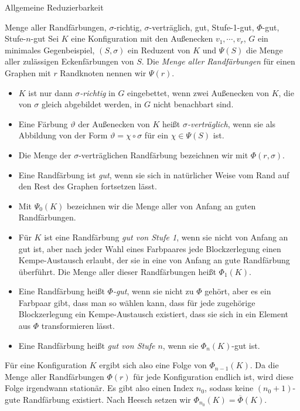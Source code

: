 \begin{section}{Allgemeine Reduzierbarkeit}
 \begin{definition}{Menge aller Randfärbungen, $\sigma$-richtig, $\sigma$-verträglich, gut, Stufe-1-gut, $\Phi$-gut, Stufe-$n$-gut}
  Sei $K$ eine Konfiguration mit den Außenecken $v_1,\cdots,v_r$, $G$ ein minimales Gegenbeispiel, $(S,\sigma)$ ein Reduzent von $K$ und $\Psi(S)$ die Menge aller zulässigen Eckenfärbungen von $S$. Die \textit{Menge aller Randfärbungen} für einen Graphen mit $r$ Randknoten nennen wir $\Psi(r)$.
  \begin{itemize}
   \item $K$ ist nur dann \textit{$\sigma$-richtig} in $G$ eingebettet, wenn zwei Außenecken von $K$, die von $\sigma$ gleich abgebildet werden, in $G$ nicht benachbart sind. 
   \item Eine Färbung $\vartheta$ der Außenecken von $K$ heißt \textit{$\sigma$-verträglich}, wenn sie als Abbildung von der Form $\vartheta = \chi \circ \sigma$ für ein $\chi \in \Psi(S)$ ist.
   \item Die Menge der $\sigma$-verträglichen Randfärbung bezeichnen wir mit $\Phi(r,\sigma)$.
   \item Eine Randfärbung ist \textit{gut}, wenn sie sich in natürlicher Weise vom Rand auf den Rest des Graphen fortsetzen lässt.
   \item Mit $\Psi_0(K)$ bezeichnen wir die Menge aller von Anfang an guten Randfärbungen.
   \item Für $K$ ist eine Randfärbung \textit{gut von Stufe 1}, wenn sie nicht von Anfang an gut ist, aber nach jeder Wahl eines Farbpaares jede Blockzerlegung einen Kempe-Austausch erlaubt, der sie in eine von Anfang an gute Randfärbung überführt. Die Menge aller dieser Randfärbungen heißt $\Phi_1(K)$.
   \item Eine Randfärbung heißt \textit{$\Phi$-gut}, wenn sie nicht zu $\Phi$ gehört, aber es ein Farbpaar gibt, dass man so wählen kann, dass für jede zugehörige Blockzerlegung ein Kempe-Austausch existiert, dass sie sich in ein Element aus $\Phi$ transformieren lässt.
   \item Eine Randfärbung heißt \textit{gut von Stufe $n$}, wenn sie $\Phi_n(K)$-gut ist.
  \end{itemize}
  Für eine Konfiguration $K$ ergibt sich also eine Folge von $\Phi_{n-1}(K)$. Da die Menge aller Randfärbungen $\Phi(r)$ für jede Konfiguration endlich ist, wird diese Folge irgendwann stationär. Es gibt also einen Index $n_0$, sodass keine $(n_0+1)$-gute Randfärbung existiert. Nach Heesch setzen wir $\Phi_{n_0}(K) = \overline{\Phi}(K)$.
 \end{definition}


\end{section}

